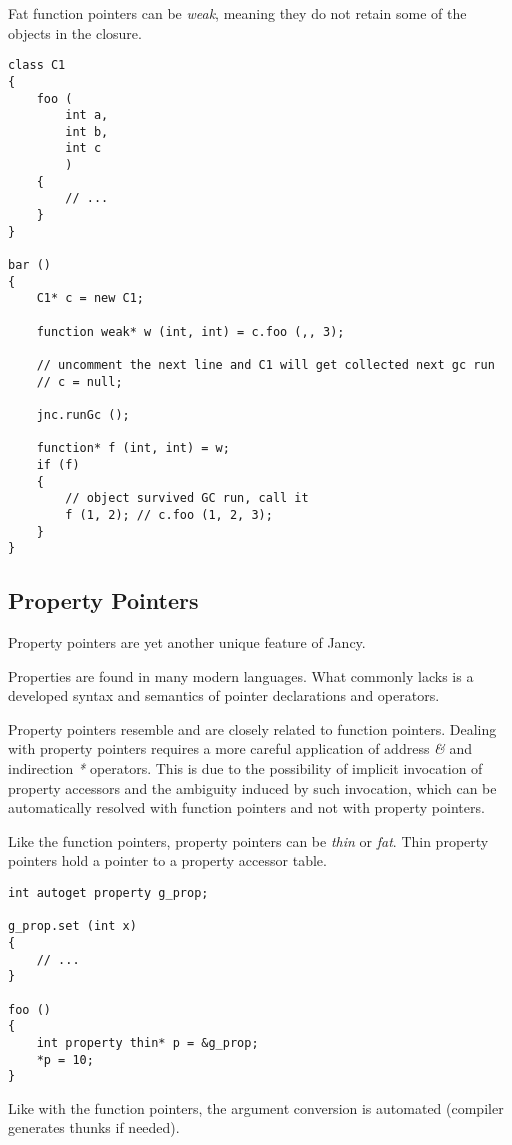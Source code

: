 \documentclass[oneside]{book}
\begin{document}
Fat function pointers can be \emph{weak}, meaning they do not retain some of the objects in the closure.

\begin{lstlisting}
class C1
{
    foo (
        int a,
        int b,
        int c       
        )
    {
        // ...
    }
}

bar ()
{
    C1* c = new C1;

    function weak* w (int, int) = c.foo (,, 3);

    // uncomment the next line and C1 will get collected next gc run
    // c = null;

    jnc.runGc ();

    function* f (int, int) = w;
    if (f)
    {
        // object survived GC run, call it
        f (1, 2); // c.foo (1, 2, 3);       
    }
}
\end{lstlisting}

\subsection{Property Pointers}

Property pointers are yet another unique feature of Jancy.

Properties are found in many modern languages. What commonly lacks is a developed syntax and semantics of pointer declarations and operators.

Property pointers resemble and are closely related to function pointers. Dealing with property pointers requires a more careful application of address \emph{\&} and indirection \emph{*} operators. This is due to the possibility of implicit invocation of property accessors and the ambiguity induced by such invocation, which can be automatically resolved with function pointers and not with property pointers.

Like the function pointers, property pointers can be \emph{thin} or \emph{fat}. Thin property pointers hold a pointer to a property accessor table.

\begin{lstlisting}
int autoget property g_prop;

g_prop.set (int x)
{
    // ...
}

foo ()
{
    int property thin* p = &g_prop;
    *p = 10;    
}
\end{lstlisting}

Like with the function pointers, the argument conversion is automated (compiler generates thunks if needed).
\end{document}
